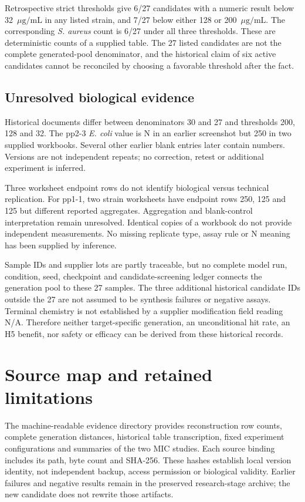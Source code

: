 \documentclass[12pt,a4paper]{article}
\newcommand{\ug}{\ensuremath{\mu\mathrm{g}/\mathrm{mL}}}
\begin{document}
\clearpage
Retrospective strict thresholds give 6/27 candidates with a numeric result below 32~\ug{} in any listed strain, and 7/27 below either 128 or 200~\ug. The corresponding \textit{S. aureus} count is 6/27 under all three thresholds. These are deterministic counts of a supplied table. The 27 listed candidates are not the complete generated-pool denominator, and the historical claim of six active candidates cannot be reconciled by choosing a favorable threshold after the fact.

\subsection{Unresolved biological evidence}
Historical documents differ between denominators 30 and 27 and thresholds 200, 128 and 32. The pp2-3 \textit{E. coli} value is N in an earlier screenshot but 250 in two supplied workbooks. Several other earlier blank entries later contain numbers. Versions are not independent repeats; no correction, retest or additional experiment is inferred.

Three worksheet endpoint rows do not identify biological versus technical replication. For pp1-1, two strain worksheets have endpoint rows 250, 125 and 125 but different reported aggregates. Aggregation and blank-control interpretation remain unresolved. Identical copies of a workbook do not provide independent measurements. No missing replicate type, assay rule or N meaning has been supplied by inference.

Sample IDs and supplier lots are partly traceable, but no complete model run, condition, seed, checkpoint and candidate-screening ledger connects the generation pool to these 27 samples. The three additional historical candidate IDs outside the 27 are not assumed to be synthesis failures or negative assays. Terminal chemistry is not established by a supplier modification field reading N/A. Therefore neither target-specific generation, an unconditional hit rate, an H5 benefit, nor safety or efficacy can be derived from these historical records.

\section{Source map and retained limitations}
The machine-readable evidence directory provides reconstruction row counts, complete generation distances, historical table transcription, fixed experiment configurations and summaries of the two MIC studies. Each source binding includes its path, byte count and SHA-256. These hashes establish local version identity, not independent backup, access permission or biological validity. Earlier failures and negative results remain in the preserved research-stage archive; the new candidate does not rewrite those artifacts.
\end{document}
